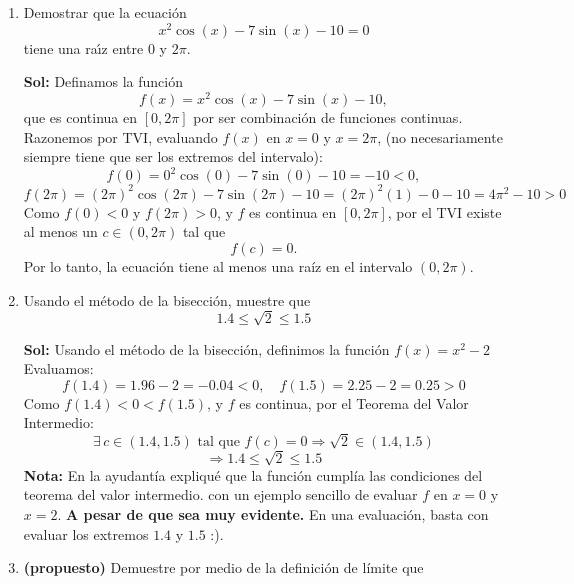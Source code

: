 \documentclass[letterpaper,12pt]{article}
\theoremstyle{plain}
\theoremstyle{definition}
\newcommand{\1}{\mathbbm{1}}
\begin{document}
\begin{enumerate}[label=\textbf{P\arabic*.}, itemsep=0cm]
\color{blue}

\textbf{Sol:} Para que \( f \) sea continua en \( x = 1 \), debe cumplirse:
\[
\lim_{x \to 1} f(x) = f(1) = \alpha.
\]
Calculamos el límite:
\[
\lim_{x \to 1} \frac{\sen(\pi x)}{x - 1}.
\]
Hacemos el cambio de variable \( h = x - 1 \), entonces \( x = 1 + h \) y cuando \( x \to 1 \), \( h \to 0 \):
\[
\lim_{h \to 0} \frac{\sen(\pi (1 + h))}{h} = \lim_{h \to 0} \frac{\sen(\pi + \pi h)}{h}.
\]
Usamos la identidad \( \sen(\pi + \theta) = -\sen(\theta) \):
\[
= \lim_{u \to 0} \frac{-\sen(\pi u)}{u} = \lim_{u \to 0} \frac{-\sen(\pi u)}{u} \cdot  \frac{\pi}{\pi} =-\pi.
\]
\color{black}

\item Demostrar que la ecuaci\'on
$$ x^2 \cos(x) - 7 \sin(x) - 10 = 0 $$
tiene una ra\'{\i}z entre $0$ y $2\pi$.

\color{blue}
\textbf{Sol:} Definamos la función
\[
f(x) = x^2 \cos(x) - 7 \sin(x) - 10,
\]
que es continua en \([0, 2\pi]\) por ser combinación de funciones continuas.
Razonemos por TVI, evaluando $f(x)$ en $x=0$ y $x=2\pi$, (no necesariamente siempre tiene que ser los extremos del intervalo):
\[
f(0) = 0^2 \cos(0) - 7 \sin(0) - 10 = -10 < 0,
\]
\[
f(2\pi) = (2\pi)^2 \cos(2\pi) - 7 \sin(2\pi) - 10 = (2\pi)^2 (1) - 0 - 10 = 4\pi^2 - 10 > 0
\]
Como \(f(0) < 0\) y \(f(2\pi) > 0\), y \(f\) es continua en \([0, 2\pi]\), por el TVI existe al menos un \(c \in (0, 2\pi)\) tal que
\[
f(c) = 0.
\]
Por lo tanto, la ecuación tiene al menos una raíz en el intervalo \((0, 2\pi)\).
\color{black}



\item Usando el m\'etodo de la bisecci\'on, muestre que
$$ 1.4 \le \sqrt{2} \le 1.5 $$

\color{blue}
\textbf{Sol:}
Usando el método de la bisección, definimos la función $f(x) = x^2 - 2$
Evaluamos:
\[
f(1.4) = 1.96 - 2 = -0.04 < 0, \quad f(1.5) = 2.25 - 2 = 0.25 > 0
\]
Como \( f(1.4) < 0 < f(1.5) \), y \( f \) es continua, por el Teorema del Valor Intermedio:
\[
\exists \, c \in (1.4, 1.5) \text{ tal que } f(c) = 0 \Rightarrow \sqrt{2} \in (1.4, 1.5)
\]
\[
\Rightarrow \boxed{1.4 \le \sqrt{2} \le 1.5}
\]
\textbf{Nota:} En la ayudantía expliqué que la función cumplía las condiciones del teorema del valor intermedio. con un ejemplo sencillo de evaluar $f$ en $x=0$ y $x=2$. \textbf{A pesar de que sea muy evidente.} En una evaluación, basta con evaluar los extremos $1.4$ y $1.5$ :).
\color{black}

\item \textbf{(propuesto)} Demuestre por medio de la definición de límite que


\end{enumerate}
\end{document}
